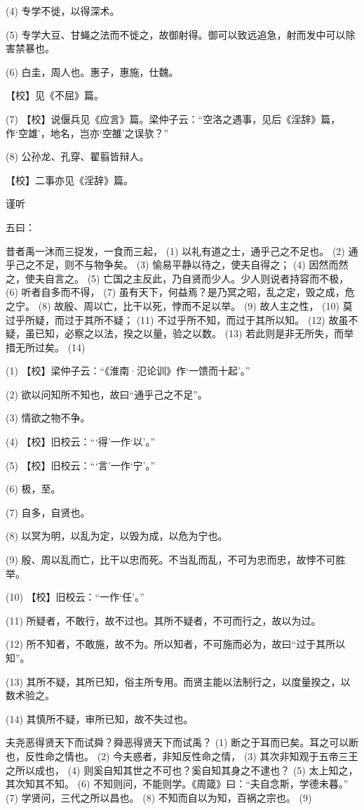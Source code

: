 \documentclass[12pt,UTF8]{ctexbook}
\begin{document}
(4) 专学不徙，以得深术。

(5) 专学大豆、甘蝇之法而不徙之，故御射得。御可以致远追急，射而发中可以除害禁暴也。

(6) 白圭，周人也。惠子，惠施，仕魏。

【校】见《不屈》篇。

(7) 【校】说偃兵见《应言》篇。梁仲子云：“空洛之遇事，见后《淫辞》篇，作‘空雄’，地名，岂亦‘空雒’之误欤？”

(8) 公孙龙、孔穿、翟翦皆辩人。

【校】二事亦见《淫辞》篇。





谨听


五曰：

昔者禹一沐而三捉发，一食而三起， (1) 以礼有道之士，通乎己之不足也。 (2) 通乎己之不足，则不与物争矣。 (3) 愉易平静以待之，使夫自得之； (4) 因然而然之，使夫自言之。 (5) 亡国之主反此，乃自贤而少人。少人则说者持容而不极， (6) 听者自多而不得， (7) 虽有天下，何益焉？是乃冥之昭，乱之定，毁之成，危之宁。 (8) 故殷、周以亡，比干以死，悖而不足以举。 (9) 故人主之性， (10) 莫过乎所疑，而过于其所不疑； (11) 不过乎所不知，而过于其所以知。 (12) 故虽不疑，虽已知，必察之以法，揆之以量，验之以数。 (13) 若此则是非无所失，而举措无所过矣。 (14)

(1) 【校】梁仲子云：“《淮南·氾论训》作‘一馈而十起’。”

(2) 欲以问知所不知也，故曰“通乎己之不足”。

(3) 情欲之物不争。

(4) 【校】旧校云：“‘得’一作‘以’。”

(5) 【校】旧校云：“‘言’一作‘宁’。”

(6) 极，至。

(7) 自多，自贤也。

(8) 以冥为明，以乱为定，以毁为成，以危为宁也。

(9) 殷、周以乱而亡，比干以忠而死。不当乱而乱，不可为忠而忠，故悖不可胜举。

(10) 【校】旧校云：“一作‘任’。”

(11) 所疑者，不敢行，故不过也。其所不疑者，不可而行之，故以为过。

(12) 所不知者，不敢施，故不为。所以知者，不可施而必为，故曰“过于其所以知”。

(13) 其所不疑，其所已知，俗主所专用。而贤主能以法制行之，以度量揆之，以数术验之。

(14) 其慎所不疑，审所已知，故不失过也。

夫尧恶得贤天下而试舜？舜恶得贤天下而试禹？ (1) 断之于耳而已矣。耳之可以断也，反性命之情也。 (2) 今夫惑者，非知反性命之情， (3) 其次非知观于五帝三王之所以成也， (4) 则奚自知其世之不可也？奚自知其身之不逮也？ (5) 太上知之，其次知其不知。 (6) 不知则问，不能则学。《周箴》曰：“夫自念斯，学德未暮。” (7) 学贤问，三代之所以昌也。 (8) 不知而自以为知，百祸之宗也。 (9)
\end{document}
